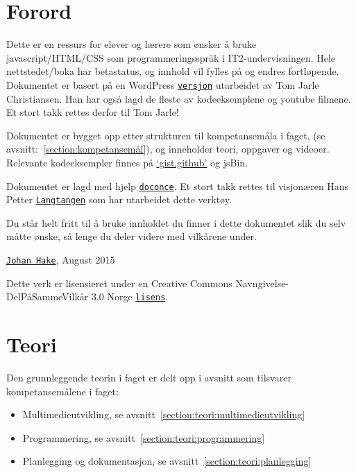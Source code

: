 \documentclass[%
oneside,                 %
final,                   %
10pt]{article}
\begin{document}
\pagebreak

\section{Forord}
\label{section:forord}

Dette er en ressurs for elever og lærere som ønsker å bruke
javascript/HTML/CSS som programmeringsspråk i IT2-undervisningen. Hele
nettstedet/boka har betastatus, og innhold vil fylles på og endres
fortløpende. Dokumentet er basert på en WordPress
\href{{http://www.fuzzbin.org/IT2}}{\nolinkurl{versjon}} utarbeidet av Tom Jarle
Christiansen. Han har også lagd de fleste av kodeeksemplene og youtube
filmene. Et stort takk rettes derfor til Tom Jarle!

Dokumentet er bygget opp etter strukturen til kompetansemåla i faget,
(se avsnitt:~\ref{section:kompetansemål}), og inneholder teori,
oppgaver og videoer. Relevante kodeeksempler finnes på
\href{{http://gist.github.com/johanhake}}{`gist.github'} og jsBin.

Dokumentet er lagd med hjelp
\href{{http://hplgit.github.io/doconce/doc/web/index.html}}{\nolinkurl{doconce}}.  Et
stort takk rettes til visjonæren Hans Petter
\href{{http://hplgit.github.io/homepage/index.html}}{\nolinkurl{Langtangen}} som har
utarbeidet dette verktøy.


Du står helt fritt til å bruke innholdet du finner i dette dokumentet
slik du selv måtte ønske, så lenge du deler videre med vilkårene
under. 

\href{{mailto:johan.hake@gmail.com}}{\nolinkurl{Johan Hake}}, August 2015

Dette verk er lisensieret under en Creative Commons
Navngivelse-DelPåSammeVilkår 3.0 Norge
\href{{http://creativecommons.org/licenses/by-sa/3.0/no/}}{\nolinkurl{lisens}}.


\pagebreak

\section{Teori}

Den grunnleggende teorin i faget er delt opp i avsnitt som tilsvarer
kompetansemålene i faget:

\begin{itemize}
\item Multimedieutvikling, se avsnitt~\ref{section:teori:multimedieutvikling}

\item Programmering, se avsnitt~\ref{section:teori:programmering}

\item Planlegging og dokumentasjon, se avsnitt~\ref{section:teori:planlegging}
\end{itemize}
\end{document}
